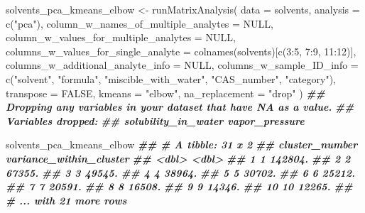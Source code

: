 \documentclass[
]{krantz}
\newenvironment{Shaded}{\begin{snugshade}}{\end{snugshade}}
\newcommand{\AttributeTok}[1]{\textcolor[rgb]{0.77,0.63,0.00}{#1}}
\newcommand{\ConstantTok}[1]{\textcolor[rgb]{0.00,0.00,0.00}{#1}}
\newcommand{\DecValTok}[1]{\textcolor[rgb]{0.00,0.00,0.81}{#1}}
\newcommand{\DocumentationTok}[1]{\textcolor[rgb]{0.56,0.35,0.01}{\textbf{\textit{#1}}}}
\newcommand{\FunctionTok}[1]{\textcolor[rgb]{0.00,0.00,0.00}{#1}}
\newcommand{\NormalTok}[1]{#1}
\newcommand{\OtherTok}[1]{\textcolor[rgb]{0.56,0.35,0.01}{#1}}
\newcommand{\SpecialCharTok}[1]{\textcolor[rgb]{0.00,0.00,0.00}{#1}}
\newcommand{\StringTok}[1]{\textcolor[rgb]{0.31,0.60,0.02}{#1}}
\begin{document}
\begin{Shaded}
\begin{Highlighting}[]
\NormalTok{solvents\_pca\_kmeans\_elbow }\OtherTok{\textless{}{-}} \FunctionTok{runMatrixAnalysis}\NormalTok{(}
  \AttributeTok{data =}\NormalTok{ solvents,}
  \AttributeTok{analysis =} \FunctionTok{c}\NormalTok{(}\StringTok{"pca"}\NormalTok{),}
  \AttributeTok{column\_w\_names\_of\_multiple\_analytes =} \ConstantTok{NULL}\NormalTok{,}
  \AttributeTok{column\_w\_values\_for\_multiple\_analytes =} \ConstantTok{NULL}\NormalTok{,}
  \AttributeTok{columns\_w\_values\_for\_single\_analyte =} \FunctionTok{colnames}\NormalTok{(solvents)[}\FunctionTok{c}\NormalTok{(}\DecValTok{3}\SpecialCharTok{:}\DecValTok{5}\NormalTok{, }\DecValTok{7}\SpecialCharTok{:}\DecValTok{9}\NormalTok{, }\DecValTok{11}\SpecialCharTok{:}\DecValTok{12}\NormalTok{)],}
  \AttributeTok{columns\_w\_additional\_analyte\_info =} \ConstantTok{NULL}\NormalTok{,}
  \AttributeTok{columns\_w\_sample\_ID\_info =} \FunctionTok{c}\NormalTok{(}\StringTok{"solvent"}\NormalTok{, }\StringTok{"formula"}\NormalTok{, }\StringTok{"miscible\_with\_water"}\NormalTok{, }\StringTok{"CAS\_number"}\NormalTok{, }\StringTok{"category"}\NormalTok{),}
  \AttributeTok{transpose =} \ConstantTok{FALSE}\NormalTok{,}
  \AttributeTok{kmeans =} \StringTok{"elbow"}\NormalTok{,}
  \AttributeTok{na\_replacement =} \StringTok{"drop"}
\NormalTok{)}
\DocumentationTok{\#\# Dropping any variables in your dataset that have NA as a value.}
\DocumentationTok{\#\# Variables dropped:}
\DocumentationTok{\#\# solubility\_in\_water vapor\_pressure}

\NormalTok{solvents\_pca\_kmeans\_elbow}
\DocumentationTok{\#\# \# A tibble: 31 x 2}
\DocumentationTok{\#\#    cluster\_number variance\_within\_cluster}
\DocumentationTok{\#\#             \textless{}dbl\textgreater{}                   \textless{}dbl\textgreater{}}
\DocumentationTok{\#\#  1              1                 142804.}
\DocumentationTok{\#\#  2              2                  67355.}
\DocumentationTok{\#\#  3              3                  49545.}
\DocumentationTok{\#\#  4              4                  38964.}
\DocumentationTok{\#\#  5              5                  30702.}
\DocumentationTok{\#\#  6              6                  25212.}
\DocumentationTok{\#\#  7              7                  20591.}
\DocumentationTok{\#\#  8              8                  16508.}
\DocumentationTok{\#\#  9              9                  14346.}
\DocumentationTok{\#\# 10             10                  12265.}
\DocumentationTok{\#\# \# ... with 21 more rows}
\end{Highlighting}
\end{Shaded}
\end{document}
